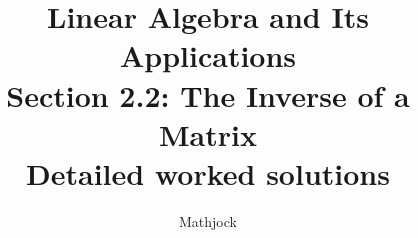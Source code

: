 
\title{\textbf{Linear Algebra and Its Applications}\\[0.3em]Section 2.2: The Inverse of a Matrix\\[0.3em]\large Detailed worked solutions}
\author{Mathjock}
\date{}

\maketitle
\bookinfo
\tableofcontents
\clearpage
\renewcommand{\thesection}{2.\arabic{section}}
\renewcommand{\theHsection}{2.\arabic{section}}
\setcounter{section}{1}



